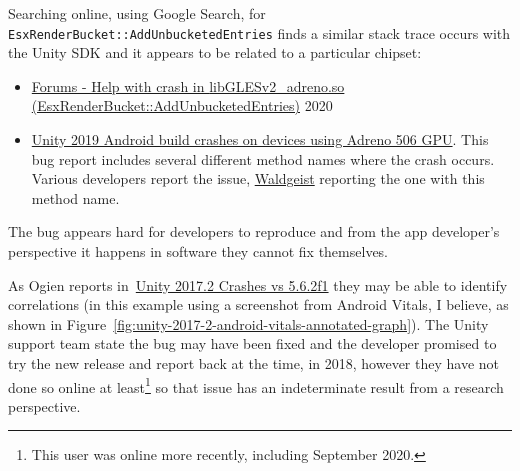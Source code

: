 Searching online, using Google Search, for \texttt{EsxRenderBucket::AddUnbucketedEntries} finds a similar stack trace occurs with the Unity SDK and it appears to be related to a particular chipset:
\begin{itemize}
    \item \href{https://developer.qualcomm.com/forum/qdn-forums/software/adreno-gpu-sdk/67924}{Forums - Help with crash in {\footnotesize libGLESv2\_adreno.so (EsxRenderBucket::AddUnbucketedEntries)}} 2020
    \item \href{https://forum.unity.com/threads/unity-2019-android-build-crashes-on-devices-using-adreno-506-gpu.712229/}{Unity 2019 Android build crashes on devices using Adreno 506 GPU}. This bug report includes several different method names where the crash occurs. Various developers report the issue, \href{https://forum.unity.com/members/waldgeist.1371619/}{Waldgeist} reporting the one with this method name.
\end{itemize}

The bug appears hard for developers to reproduce and from the app developer's perspective it happens in software they cannot fix themselves. 

As Ogien reports in~\href{https://forum.unity.com/threads/unity-2017-2-crashes-vs-5-6-2f1.511995/}{Unity 2017.2 Crashes vs 5.6.2f1} they may be able to identify correlations (in this example using a screenshot from Android Vitals, I believe, as shown in Figure~\ref{fig:unity-2017-2-android-vitals-annotated-graph}). The Unity support team state the bug may have been fixed and the developer promised to try the new release and report back at the time, in 2018, however they have not done so online at least\footnote{This user was online more recently, including  September 2020.} so that issue has an indeterminate result from a research perspective.

